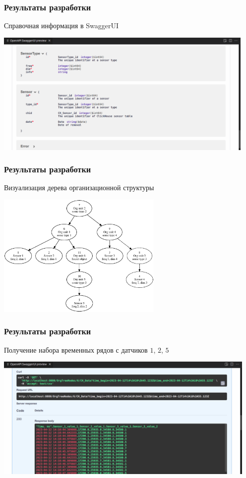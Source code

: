 \documentclass[pdf, hyperref={unicode}, aspectratio=169]{beamer}
\begin{document}
\begin{frame}
	\frametitle{Результаты разработки}
	
	Справочная информация в SwaggerUI
	
	\begin{center}
		\includegraphics[height = 6cm]{swagger2.png}
	\end{center}
\end{frame}


\begin{frame}
	\frametitle{Результаты разработки}
	
	Визуализация дерева организационной структуры
	
	\begin{center}
		\includegraphics[height = 6cm]{demo_del8.eps}
	\end{center}
\end{frame}


\begin{frame}
	\frametitle{Результаты разработки}
	
	Получение набора временных рядов с датчиков $1$, $2$, $5$
	
	\begin{center}
		\includegraphics[height = 6cm]{swagger8.png}
	\end{center}
\end{frame}
\end{document}
